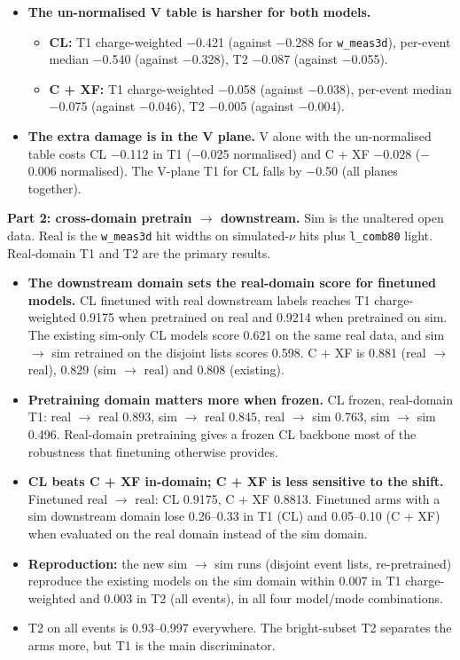 \documentclass[10pt,a4paper]{article}
\begin{document}
\begin{itemize}
\item \textbf{The un-normalised V table is harsher for both models.}
\begin{itemize}
\item \textbf{CL:} T1 charge-weighted $-$0.421 (against $-$0.288 for \texttt{w\_\allowbreak{}meas3d}), per-event median $-$0.540 (against $-$0.328), T2 $-$0.087 (against $-$0.055).
\item \textbf{C + XF:} T1 charge-weighted $-$0.058 (against $-$0.038), per-event median $-$0.075 (against $-$0.046), T2 $-$0.005 (against $-$0.004).
\end{itemize}
\item \textbf{The extra damage is in the V plane.} V alone with the un-normalised table costs CL $-$0.112 in T1 ($-$0.025 normalised) and C + XF $-$0.028 ($-$0.006 normalised). The V-plane T1 for CL falls by $-$0.50 (all planes together).
\end{itemize}
\textbf{Part 2: cross-domain pretrain $\rightarrow$ downstream.} Sim is the unaltered open data. Real is the \texttt{w\_\allowbreak{}meas3d} hit widths on simulated-$\nu$ hits plus \texttt{l\_\allowbreak{}comb80} light. Real-domain T1 and T2 are the primary results.

\begin{itemize}
\item \textbf{The downstream domain sets the real-domain score for finetuned models.} CL finetuned with real downstream labels reaches T1 charge-weighted 0.9175 when pretrained on real and 0.9214 when pretrained on sim. The existing sim-only CL models score 0.621 on the same real data, and sim $\rightarrow$ sim retrained on the disjoint lists scores 0.598. C + XF is 0.881 (real $\rightarrow$ real), 0.829 (sim $\rightarrow$ real) and 0.808 (existing).
\item \textbf{Pretraining domain matters more when frozen.} CL frozen, real-domain T1: real $\rightarrow$ real 0.893, sim $\rightarrow$ real 0.845, real $\rightarrow$ sim 0.763, sim $\rightarrow$ sim 0.496. Real-domain pretraining gives a frozen CL backbone most of the robustness that finetuning otherwise provides.
\item \textbf{CL beats C + XF in-domain; C + XF is less sensitive to the shift.} Finetuned real $\rightarrow$ real: CL 0.9175, C + XF 0.8813. Finetuned arms with a sim downstream domain lose 0.26--0.33 in T1 (CL) and 0.05--0.10 (C + XF) when evaluated on the real domain instead of the sim domain.
\item \textbf{Reproduction:} the new sim $\rightarrow$ sim runs (disjoint event lists, re-pretrained) reproduce the existing models on the sim domain within 0.007 in T1 charge-weighted and 0.003 in T2 (all events), in all four model/mode combinations.
\item T2 on all events is 0.93--0.997 everywhere. The bright-subset T2 separates the arms more, but T1 is the main discriminator.
\end{itemize}
\end{document}
